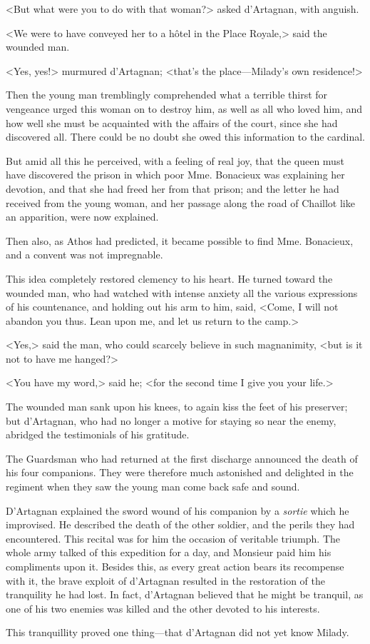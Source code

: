 <But what were you to do with that woman?> asked d'Artagnan, with anguish. 

<We were to have conveyed her to a hôtel in the Place Royale,> said the wounded man. 

<Yes, yes!> murmured d'Artagnan; <that's the place---Milady's own residence!> 

Then the young man tremblingly comprehended what a terrible thirst for vengeance urged this woman on to destroy him, as well as all who loved him, and how well she must be acquainted with the affairs of the court, since she had discovered all. There could be no doubt she owed this information to the cardinal. 

But amid all this he perceived, with a feeling of real joy, that the queen must have discovered the prison in which poor Mme. Bonacieux was explaining her devotion, and that she had freed her from that prison; and the letter he had received from the young woman, and her passage along the road of Chaillot like an apparition, were now explained. 

Then also, as Athos had predicted, it became possible to find Mme. Bonacieux, and a convent was not impregnable. 

This idea completely restored clemency to his heart. He turned toward the wounded man, who had watched with intense anxiety all the various expressions of his countenance, and holding out his arm to him, said, <Come, I will not abandon you thus. Lean upon me, and let us return to the camp.> 

<Yes,> said the man, who could scarcely believe in such magnanimity, <but is it not to have me hanged?> 

<You have my word,> said he; <for the second time I give you your life.> 

The wounded man sank upon his knees, to again kiss the feet of his preserver; but d'Artagnan, who had no longer a motive for staying so near the enemy, abridged the testimonials of his gratitude. 

The Guardsman who had returned at the first discharge announced the death of his four companions. They were therefore much astonished and delighted in the regiment when they saw the young man come back safe and sound. 

D'Artagnan explained the sword wound of his companion by a \textit{sortie} which he improvised. He described the death of the other soldier, and the perils they had encountered. This recital was for him the occasion of veritable triumph. The whole army talked of this expedition for a day, and Monsieur paid him his compliments upon it. Besides this, as every great action bears its recompense with it, the brave exploit of d'Artagnan resulted in the restoration of the tranquility he had lost. In fact, d'Artagnan believed that he might be tranquil, as one of his two enemies was killed and the other devoted to his interests. 

This tranquillity proved one thing---that d'Artagnan did not yet know Milady. 